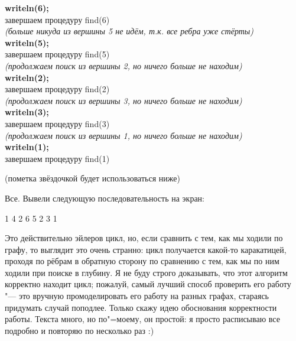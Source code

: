 {\ind \ind \ind \ind \textbf{writeln(6);}\\
\ind \ind \ind \ind завершаем процедуру find(6)\\
\ind \ind \ind \textit{(больше никуда из вершины 5 не идём, т.к. все ребра уже стёрты)}\\
\ind \ind \ind \textbf{writeln(5);}\\
\ind \ind \ind завершаем процедуру find(5)\\
\ind \ind \textit{(продолжаем поиск из вершины 2, но ничего больше не находим)}\\
\ind \ind \textbf{writeln(2);}\\
\ind \ind завершаем процедуру find(2)\\
\ind \textit{(продолжаем поиск из вершины 3, но ничего больше не находим)}\\
\ind \textbf{writeln(3);}\\
\ind завершаем процедуру find(3)\\
\textit{(продолжаем поиск из вершины 1, но ничего больше не находим)}\\
\textbf{writeln(1);}\\
завершаем процедуру find(1)
}

\vspace{0.3cm}
(пометка звёздочкой будет использоваться ниже)

Все. Вывели следующую последовательность на экран:

1 4 2 6 5 2 3 1

Это действительно эйлеров цикл, но, если сравнить с тем, как мы ходили по графу, то выглядит это 
очень странно: цикл получается какой-то каракатицей, проходя по рёбрам в обратную сторону по 
сравнению с тем, как мы по ним ходили при поиске в глубину. Я не буду строго доказывать, что этот 
алгоритм корректно находит цикл; пожалуй, самый лучший способ проверить его работу "--- это 
вручную промоделировать его работу на разных графах, стараясь придумать случай поподлее. Только 
скажу идею обоснования корректности работы. Текста много, но по"=моему, он простой: я просто 
расписываю все подробно и повторяю по несколько раз :) 

